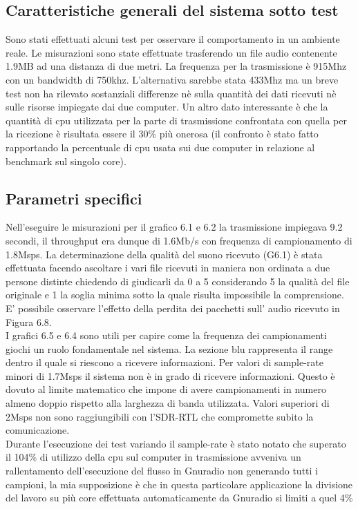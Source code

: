 \subsection{Caratteristiche generali del sistema sotto test}
 Sono stati effettuati alcuni test per osservare il comportamento in un ambiente reale. Le misurazioni sono state effettuate trasferendo un file audio contenente 1.9MB ad una distanza di due metri. La frequenza per la trasmissione è 915Mhz con un bandwidth di 750khz. L'alternativa sarebbe stata 433Mhz ma un breve test non ha rilevato sostanziali differenze nè sulla quantità dei dati ricevuti nè sulle risorse impiegate dai due computer.
 Un altro dato interessante è che la quantità di cpu utilizzata per la parte di trasmissione confrontata con quella per la ricezione è risultata essere il 30\% più onerosa (il confronto è stato fatto rapportando la percentuale di cpu usata sui due computer in relazione al benchmark sul singolo core).
 \subsection{Parametri specifici}
 Nell'eseguire le misurazioni per il grafico 6.1 e 6.2 la trasmissione impiegava 9.2 secondi, il throughput era dunque di 1.6Mb/s con frequenza di campionamento di 1.8Msps.
 La determinazione della qualità del suono ricevuto (G6.1) è stata effettuata facendo ascoltare i vari file ricevuti in maniera non ordinata a due persone distinte chiedendo di giudicarli da 0 a 5 considerando 5 la qualità del file originale e 1 la soglia minima sotto la quale risulta impossibile la comprensione.
 E' possibile osservare l'effetto della perdita dei pacchetti sull' audio ricevuto in Figura 6.8.
 \\I grafici 6.5 e 6.4 sono utili per capire come la frequenza dei campionamenti giochi un ruolo fondamentale nel sistema.
 La sezione blu rappresenta il range dentro il quale si riescono a ricevere informazioni. Per valori di sample-rate minori di 1.7Msps il sistema non è in grado di ricevere informazioni. Questo è dovuto al limite matematico che impone di avere campionamenti in numero almeno doppio rispetto alla larghezza di banda utilizzata.
 Valori superiori di 2Msps non sono raggiungibili con l'SDR-RTL che compromette subito la comunicazione.
 \\Durante l'esecuzione dei test variando il sample-rate è stato notato che superato il 104\% di utilizzo della cpu sul computer in trasmissione avveniva un rallentamento dell'esecuzione del flusso in Gnuradio non generando tutti i campioni, la mia supposizione è che in questa particolare applicazione la divisione del lavoro su più core effettuata automaticamente da Gnuradio si limiti a quel 4\%
 
